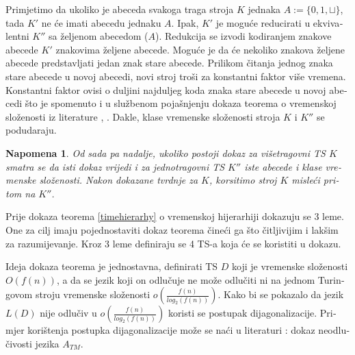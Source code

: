 \documentclass[12pt]{rectors}
\newtheorem{remark}{Napomena}[section]
\begin{document}
\begin{otherlanguage}{croatian}
Primjetimo da ukoliko je abeceda svakoga traga stroja $K$ jednaka $A:=\{0,1,\sqcup\}$, tada 
$K'$ ne će imati abecedu jednaku $A$.
Ipak, $K'$ je moguće reducirati u ekvivalentni $K''$ sa željenom abecedom ($A$).
Redukcija se izvodi
kodiranjem znakove abecede $K'$ znakovima željene abecede.
Moguće je da će nekoliko znakova željene abecede predstavljati jedan znak stare abecede.
Prilikom čitanja jednog znaka stare abecede u novoj abecedi, novi stroj troši za konstantni faktor više vremena. Konstantni faktor ovisi o duljini najduljeg koda znaka stare abecede u novoj abecedi što je spomenuto i u službenom pojašnjenju dokaza teorema o vremenskoj složenosti iz literature \cite{sipser2006},
\cite{SipserErrata}.
Dakle, klase vremenske složenosti stroja $K$
i $K''$ se podudaraju.

\begin{remark}
Od sada pa nadalje, ukoliko postoji dokaz za višetragovni TS $K$ smatra
se da isti dokaz vrijedi i za jednotragovni TS $K''$ iste abecede i klase vremenske složenosti.
Nakon dokazane tvrdnje za $K$, korsitimo stroj $K$ misleći pritom na $K''$.
\end{remark}

Prije dokaza teorema \ref{timehierarhy} o vremenskoj hijerarhiji dokazuju se 3 leme. One za cilj imaju
pojednostaviti dokaz teorema čineći ga što čitljivijim i lakšim za razumijevanje.
Kroz 3 leme definiraju se 4 TS-a koja će se koristiti u dokazu.

Ideja dokaza teorema je jednostavna, definirati TS $D$ koji je vremenske složenosti
$O(f(n))$, a da se jezik koji on odlučuje ne može odlučiti ni na jednom Turingovom stroju
vremenske složenosti $o( \frac {f\left ( n \right )}{log_2\left ( f\left ( n \right ) \right )})$. Kako bi se pokazalo da jezik $L(D)$ nije odlučiv u $o( \frac {f\left ( n \right )}{log_2\left ( f\left ( n \right ) \right )})$ koristi se postupak dijagonalizacije.
Primjer korištenja postupka dijagonalizacije može se naći u literaturi
{\cite{sipser2006}}: dokaz neodlučivosti jezika $A_{TM}$.
\vspace{2cm}


\end{otherlanguage}
\end{document}
